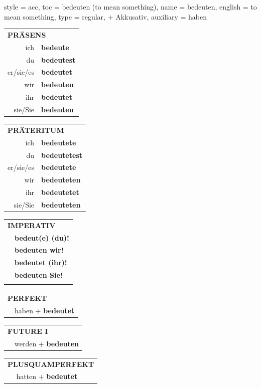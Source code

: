 \begin{verbentry}{
  style = {acc},
  toc = {bedeuten (to mean something)},
  name = {bedeuten},
  english = {to mean something},
  type = {regular, + Akkusativ},
  auxiliary = {haben}
}
  \begin{tabular}{rl}
     \multicolumn{2}{l}{\textbf{PRÄSENS} }\\
    ich & \textbf{bedeute}\\
    du & \textbf{bedeutest}\\
    er/sie/es & \textbf{bedeutet}\\
    wir & \textbf{bedeuten}\\
    ihr & \textbf{bedeutet}\\
    sie/Sie & \textbf{bedeuten}\\
  \end{tabular}
  \hfill
     \begin{tabular}{rl}
    \multicolumn{2}{l}{\textbf{PRÄTERITUM} }\\
    ich & \textbf{bedeutete}\\
    du & \textbf{bedeutetest}\\
    er/sie/es & \textbf{bedeutete}\\
    wir & \textbf{bedeuteten}\\
    ihr & \textbf{bedeutetet}\\
    sie/Sie & \textbf{bedeuteten}\\
  \end{tabular}
  \hfill
  \begin{tabular}{rl}
     \multicolumn{2}{l}{\textbf{IMPERATIV} }\\
   & \textbf{bedeut(e) (du)!}\\
   & \textbf{bedeuten wir!}\\
   & \textbf{bedeutet (ihr)!}\\
   & \textbf{bedeuten Sie!}\\
   & \vspace{10pt}
  \end{tabular}

    \vspace{10pt}

 \begin{tabular}{rl}
     \multicolumn{2}{l}{\textbf{PERFEKT}}\\
   & haben + \textbf{bedeutet}\\
  \end{tabular}
\hfill
   \begin{tabular}{rl}
   
    \multicolumn{2}{l}{\textbf{FUTURE I} }\\
   & werden + \textbf{bedeuten}\\
 
  \end{tabular}
\hfill
   \begin{tabular}{rl}
      \multicolumn{2}{l}{\textbf{PLUSQUAMPERFEKT}}\\
   & hatten + \textbf{bedeutet}\\
  \end{tabular}
  

\end{verbentry}
